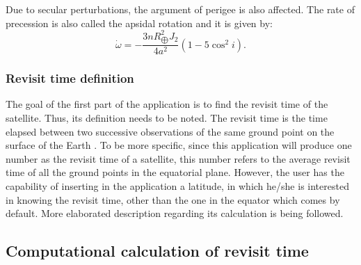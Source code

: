 Due to secular perturbations, the argument of perigee is also affected. The rate of precession is also called the apsidal rotation and it is given by:
\begin{equation}
\dot{\omega} = - \frac{3 n R_{\bigoplus}^{2} J_{2}}{4 a^{2}} (1 - 5 \cos^{2}{i}).
\end{equation}


\bigskip
\subsubsection{Revisit time definition}
\bigskip

The goal of the first part of the application is to find the revisit time of the satellite. Thus, its definition needs to be noted. The revisit time is the time elapsed between two successive observations of the same ground point on the surface of the Earth \cite{Luo}. To be more specific, since this application will produce one number as the revisit time of a satellite, this number refers to the average revisit time of all the ground points in the equatorial plane. However, the user has the capability of inserting in the application a latitude, in which he/she is interested in knowing the revisit time, other than the one in the equator which comes by default. More elaborated description regarding its calculation is being followed.


\bigskip
\subsection{Computational calculation of revisit time}
\bigskip

